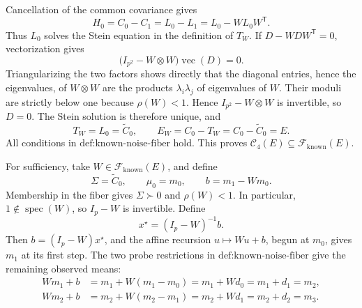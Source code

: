 Cancellation of the common covariance gives
\[
 H_0=C_0-C_1=L_0-L_1=L_0-WL_0W^{\mathsf T}.
\]
Thus \(L_0\) solves the Stein equation in the definition of \(T_W\).  If \(D-WDW^{\mathsf T}=0\), vectorization gives
\[
 \bigl(I_{p^2}-W\otimes W\bigr)\operatorname{vec}(D)=0.
\]
Triangularizing the two factors shows directly that the diagonal entries, hence the eigenvalues, of \(W\otimes W\) are the products \(\lambda_i\lambda_j\) of eigenvalues of \(W\).  Their moduli are strictly below one because \(\rho(W)<1\).  Hence \(I_{p^2}-W\otimes W\) is invertible, so \(D=0\).  The Stein solution is therefore unique, and
\[
 T_W=L_0=\widetilde C_0,
 \qquad
 E_W=C_0-T_W=C_0-\widetilde C_0=E.
\]
All conditions in \(\text{def:known-noise-fiber}\) hold.  This proves \(\mathcal C_4(E)\subseteq\mathcal F_{\mathrm{known}}(E)\).

For sufficiency, take \(W\in\mathcal F_{\mathrm{known}}(E)\), and define
\[
 \Sigma=\widetilde C_0,
 \qquad
 \mu_0=m_0,
 \qquad
 b=m_1-Wm_0.
\]
Membership in the fiber gives \(\Sigma\succ0\) and \(\rho(W)<1\).  In particular, \(1\notin\operatorname{spec}(W)\), so \(I_p-W\) is invertible.  Define
\[
 x^\star=(I_p-W)^{-1}b.
\]
Then \(b=(I_p-W)x^\star\), and the affine recursion \(u\mapsto Wu+b\), begun at \(m_0\), gives \(m_1\) at its first step.  The two probe restrictions in \(\text{def:known-noise-fiber}\) give the remaining observed means:
\[
 \begin{aligned}
 Wm_1+b
 &=m_1+W(m_1-m_0)
 =m_1+Wd_0
 =m_1+d_1=m_2,\\
 Wm_2+b
 &=m_2+W(m_2-m_1)
 =m_2+Wd_1
 =m_2+d_2=m_3.
 \end{aligned}
\]

